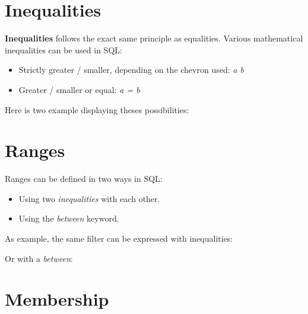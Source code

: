 \documentclass[12pt, letterpaper]{report}
\begin{document}






\section{Inequalities}

\textbf{Inequalities} follows the exact same principle as equalities.
Various mathematical inequalities can be used in SQL:

\begin{itemize}
	\item Strictly greater / smaller, depending on the chevron used: \textit{a \> b}
	\item Greater / smaller or equal: \textit{a \>= b}
\end{itemize}

Here is two example displaying theses possibilities:





\section{Ranges}

Ranges can be defined in two ways in SQL:

\begin{itemize}
	\item Using two \textit{inequalities} with each other.
	\item Using the \textit{between} keyword.
\end{itemize}

As example, the same filter can be expressed with inequalities:


Or with a \textit{between}:


\section{Membership}
\end{document}
